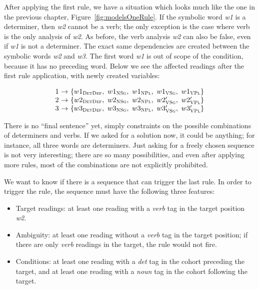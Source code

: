 After applying the first rule, we have a situation which looks much like the one in the previous chapter, Figure~\ref{fig:modelsOneRule}. 
If the symbolic word {\em w1} is a determiner, then {\em w2} cannot be a verb; 
the only exception is the case where verb is the only analysis of {\em w2}. 
As before, the verb analysis {\em w2} can also be false, even if {\em w1} 
is not a determiner. The exact same dependencies are created between the 
symbolic words {\em w2} and {\em w3}.
The first word {\em w1} is out of scope of the condition, because it has no preceding word. 
Below we see the affected readings after the first rule application, with newly created variables:

\begin{figure}[h]
$$\begin{array}{l @{~\rightarrow~} l}
1 & \{w1_{\detdef}, \  w1_{\noun\sg}, \  w1_{\noun\pl}, \ w1_{\verb\sg}, \ w1_{\verb\pl} \} \\
2 & \{w2_{\detdef}, \  w2_{\noun\sg}, \  w2_{\noun\pl}, \ w2'_{\verb\sg}, \ w2'_{\verb\pl} \} \\
3 & \{w3_{\detdef}, \  w3_{\noun\sg}, \  w3_{\noun\pl}, \ w3'_{\verb\sg}, \ w3'_{\verb\pl} \} \\
\end{array}$$
\end{figure}

There is no ``final sentence'' yet, simply constraints on the possible combinations of determiners and verbs. If we asked for a solution now, it could be anything; for instance, all three words are determiners. Just asking for a freely chosen sequence is not very interesting; there are so many possibilities, and even after applying more rules, most of the combinations are not explicitly prohibited. 

We want to know if there is a sequence that can trigger the last rule.
In order to trigger the rule, the sequence must have the following three features:
\begin{itemize}
\item Target readings: at least one reading with a \emph{verb} tag in the target position {\em w2}.
\item Ambiguity: at least one reading without a \emph{verb} tag in the target position; if there are only \emph{verb} readings in the target, the rule would not fire.
\item Conditions: at least one reading with a \emph{det} tag in the cohort preceding the target, and at least one reading with a \emph{noun} tag in the cohort following the target.
\end{itemize}


